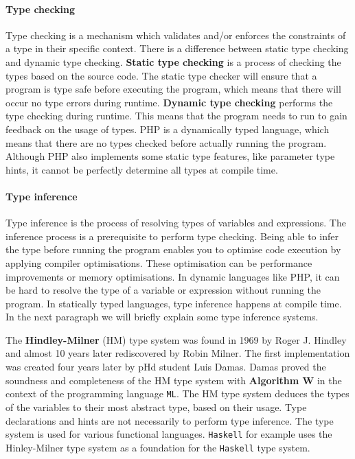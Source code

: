 \documentclass[../main.tex]{subfiles}
\begin{document}
    \paragraph{Type checking}
    Type checking is a mechanism which validates and/or enforces the constraints of a type in their specific context.
    There is a difference between static type checking and dynamic type checking.
    \textbf{Static type checking} is a process of checking the types based on the source code.
    The static type checker will ensure that a program is type safe before executing the program, which means that there will occur no type errors during runtime.
    \textbf{Dynamic type checking} performs the type checking during runtime.
    This means that the program needs to run to gain feedback on the usage of types.
    PHP is a dynamically typed language, which means that there are no types checked before actually running the program.
    Although PHP also implements some static type features, like parameter type hints, it cannot be perfectly determine all types at compile time.
        
    \paragraph{Type inference}
    Type inference is the process of resolving types of variables and expressions.
    The inference process is a prerequisite to perform type checking.
    Being able to infer the type before running the program enables you to optimise code execution by applying compiler optimisations.
    These optimisation can be performance improvements or memory optimisations.
    In dynamic languages like PHP, it can be hard to resolve the type of a variable or expression without running the program.
    In statically typed languages, type inference happens at compile time.
    In the next paragraph we will briefly explain some type inference systems.
    
    The \textbf{Hindley-Milner}\cite{Hin:69} (HM) type system was found in 1969 by Roger J. Hindley and almost 10 years later rediscovered\cite{Mil:78} by Robin Milner.
    The first implementation was created four years later by pHd student Luis Damas.
    Damas proved the soundness and completeness of the HM type system with \textbf{Algorithm W}\cite{Dam:82}  in the context of the programming language \texttt{ML}.
    The HM type system deduces the types of the variables to their most abstract type, based on their usage.
    Type declarations and hints are not necessarily to perform type inference.
    The type system is used for various functional languages. 
    \texttt{Haskell} for example uses the Hinley-Milner type system as a foundation for the \texttt{Haskell} type system. 
    
\end{document}
